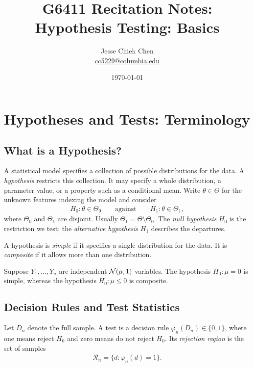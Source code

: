 \documentclass[a4paper,12pt]{article}
\title{G6411 Recitation Notes: Hypothesis Testing: Basics}
\author{Jesse Chieh Chen\\\href{mailto:cc5229@columbia.edu}{cc5229@columbia.edu}}
\date{\today}
\begin{document}
\maketitle

\section{Hypotheses and Tests: Terminology}

\subsection{What is a Hypothesis?}

A statistical model specifies a collection of possible distributions for the data.
A \emph{hypothesis} restricts this collection.
It may specify a whole distribution, a parameter value, or a property such as a conditional mean.
Write $\theta\in\Theta$ for the unknown features indexing the model and consider
\begin{align}
	H_0:\theta\in\Theta_0
	\qquad\text{against}\qquad
	H_1:\theta\in\Theta_1,
\end{align}
where $\Theta_0$ and $\Theta_1$ are disjoint.
Usually $\Theta_1=\Theta\setminus\Theta_0$.
The \emph{null hypothesis} $H_0$ is the restriction we test;
the \emph{alternative hypothesis} $H_1$ describes the departures.

\begin{definition}
	A hypothesis is \emph{simple} if it specifies a single distribution for the data.
	It is \emph{composite} if it allows more than one distribution.
\end{definition}

\begin{example}
	Suppose $Y_1,...,Y_n$ are independent $\operatorname{\mathcal{N}}(\mu,1)$ variables.
	The hypothesis $H_0:\mu=0$ is simple,
	whereas the hypothesis $H_0:\mu\le0$ is composite.
\end{example}

\subsection{Decision Rules and Test Statistics}

\begin{definition}
	Let $D_n$ denote the full sample.
	A test is a decision rule $\varphi_n(D_n)\in\{0,1\}$,
	where one means reject $H_0$ and zero means do not reject $H_0$.
	Its \emph{rejection region} is the set of samples
	\begin{align}
		\mathcal R_n=\{d:\varphi_n(d)=1\}.
	\end{align}
\end{definition}
\end{document}
